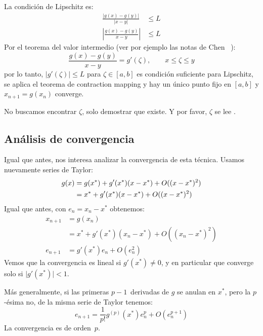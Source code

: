   La condición de Lipschitz es:
  \begin{align*}
    \frac{\lvert g(x) - g(y) \rvert}{\lvert x - y \rvert}
       & \le L \\
    \left\lvert \frac{g(x) - g(y)}{x - y} \right\rvert
       & \le L
  \end{align*}
  Por el teorema del valor intermedio
  (ver por ejemplo las notas de Chen~%
    \cite{chen08:_first_year_calculus}):
  \begin{equation}
    \frac{g(x) - g(y)}{x - y}
      = g'(\zeta),
           \qquad x \le \zeta \le y
  \end{equation}
  por lo tanto,
  \(\lvert g'(\zeta) \rvert \le L\) para \(\zeta \in [a, b]\)
  es condición suficiente para Lipschitz,
  se aplica el teorema de contraction mapping
  y hay un único punto fijo en \([a, b]\) y \(x_{n+1} = g(x_n)\) converge.

  No buscamos encontrar \(\zeta\),
  solo demostrar que existe.
  Y por favor, \(\zeta\) se lee .

\subsection{Análisis de convergencia}
\label{sec:FPI-convergence}

  Igual que antes,
  nos interesa analizar la convergencia de esta técnica.
  Usamos nuevamente series de Taylor:
  \begin{align}
    g(x)
      &= g(x^*) + g'(x^*) (x - x^*) + O((x - x^*)^2) \notag \\
      &= x^* + g'(x^*) (x - x^*) + O((x - x^*)^2)
           \label{eq:g-approx-FPI}
  \end{align}
  Igual que antes,
  con \(e_n = x_n - x^*\) obtenemos:
  \begin{align*}
    x_{n + 1}
      &= g(x_n) \\
      &= x^* + g'(x^*) (x_n - x^*) + O((x_n - x^*)^2) \\
    e_{n + 1}
      &= g'(x^*) e_n + O(e_n^2)
  \end{align*}
  Vemos que la convergencia es lineal si \(g'(x^*) \ne 0\),
  y en particular que converge solo si \(\lvert g'(x^*) \rvert < 1\).

  Más generalmente,
  si las primeras \(p - 1\)~derivadas de \(g\) se anulan en \(x^*\),
  pero la \(p\)\nobreakdash-ésima no,
  de la misma serie de Taylor tenemos:
  \begin{equation*}
    e_{n + 1}
      = \frac{1}{p!} g^{(p)}(x^*) e_n^p + O(e_n^{p + 1})
  \end{equation*}
  La convergencia es de orden~\(p\).

